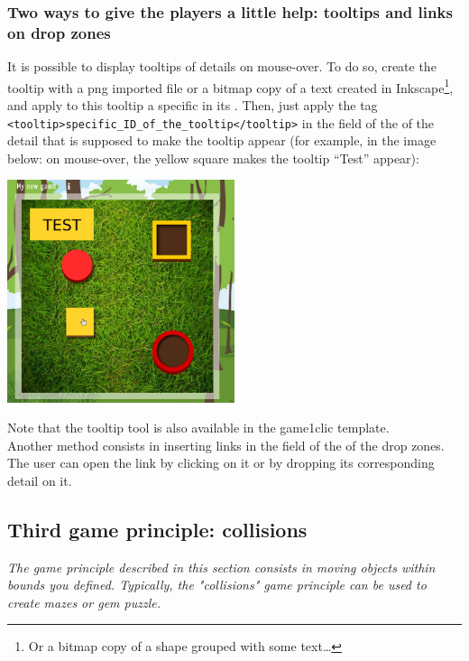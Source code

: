 \subsubsection{Two ways to give the players a little help: tooltips and links on drop zones}

It is possible to display tooltips of details on mouse-over. To do so, 
create the tooltip with a png imported file or a bitmap copy of a text created in 
Inkscape\footnote{Or a bitmap copy of a shape grouped with some text\ldots}, and 
apply to this tooltip a specific  in its . Then, 
just apply the tag \verb|<tooltip>specific_ID_of_the_tooltip</tooltip>| in the 
 field of the  of the detail that is supposed 
to make the tooltip appear (for example, in the image below: on mouse-over, the
yellow square makes the tooltip ``Test'' appear):\\


\begin{center}
 \includegraphics[width=0.5\textwidth]{images/tooltip_example}\\
 \end{center}


Note that the tooltip tool is also available in the game1clic template.\\
 
Another method consists in inserting links in the  field of the  
of the drop zones. The user can open the link by clicking on it or by dropping its corresponding detail on it.

\subsection{Third game principle: collisions}

\textit{The game principle described in this section consists in moving objects
within bounds you defined. Typically, the "collisions" game principle
can be used to create mazes or gem puzzle.}

